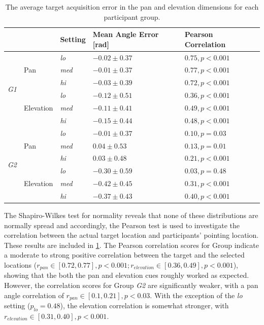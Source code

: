 \documentclass{article}
\begin{document}
\begin{table}
  \centering
  \caption{The average target acquisition error in the pan and elevation dimensions for each participant group. }\label{tab:target-results}
  \begin{tabular}{p{0.5cm}p{0.7cm}p{1cm}p{2cm}p{2.25cm}}
    \toprule
    &           & Setting      & Mean Angle Error [rad] & Pearson Correlation \\ \midrule
    \multirow{6}{*}{\textit{G1}}
    &           & \textit{lo}  & $-0.02\pm0.37$ & $0.75, p < 0.001$ \\
    & Pan       & \textit{med} & $-0.01\pm0.37$ & $0.77, p < 0.001$ \\
    &           & \textit{hi}  & $-0.03\pm0.39$ & $0.72, p < 0.001$ \\ \cline{3-5}
    &           & \textit{lo}  & $-0.12\pm0.51$ & $0.36, p < 0.001$ \\
    & Elevation & \textit{med} & $-0.11\pm0.41$ & $0.49, p < 0.001$ \\
    &           & \textit{hi}  & $-0.15\pm0.44$ & $0.48, p < 0.001$ \\ \midrule
    \multirow{6}{*}{\textit{G2}}
    &           & \textit{lo}  & $-0.01\pm0.37$ & $0.10, p = 0.03$  \\
    & Pan       & \textit{med} & $ 0.04\pm0.53$ & $0.13, p = 0.01$  \\
    &           & \textit{hi}  & $ 0.03\pm0.48$ & $0.21, p < 0.001$ \\\cline{3-5}
    &           & \textit{lo}  & $-0.30\pm0.59$ & $0.03, p = 0.48$  \\
    & Elevation & \textit{med} & $-0.42\pm0.45$ & $0.31, p < 0.001$ \\
    &           & \textit{hi}  & $-0.37\pm0.43$ & $0.40, p < 0.001$ \\ 
    \bottomrule
  \end{tabular}
\end{table}

The Shapiro-Wilkes test for normality reveals that none of these distributions are normally spread and accordingly, the Pearson test is used to investigate the correlation between the actual target location and participants' pointing location.
These results are included in \cref{tab:target-results}.
The Pearson correlation scores for Group  indicate a moderate to strong positive correlation between the target and the selected locations ($r_{pan} \in [0.72, 0.77], p < 0.001; r_{elevation} \in [0.36, 0.49], p < 0.001$), showing that the both the pan and elevation cues roughly worked as expected.
However, the correlation scores for Group \textit{G2} are significantly weaker, with a pan angle correlation of $r_{pan} \in [0.1, 0.21], p < 0.03$.
With the exception of the \textit{lo} setting ($p_{lo} = 0.48$), the elevation correlation is somewhat stronger, with $r_{elevation} \in [0.31, 0.40], p < 0.001$.
\end{document}
